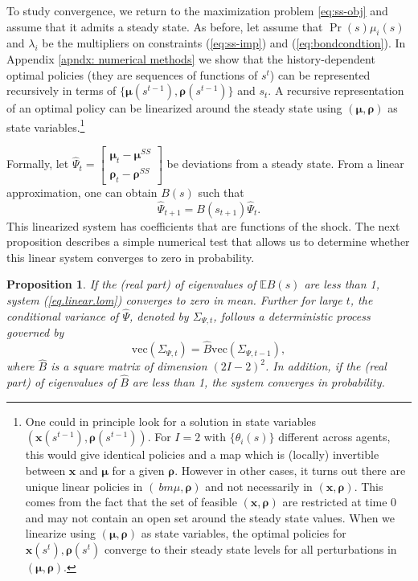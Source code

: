 \documentclass[thmsb,11pt]{article}
\newtheorem{proposition}{Proposition}
\newcommand{\bmat}{\begin{matrix}}
\newcommand{\emat}{\end{matrix}}
\begin{document}
To study convergence, we return to the maximization problem \eqref{eq:ss-obj} and assume that it admits a steady state. As before, let assume that $\Pr(s)\mu_i(s)$ and $\lambda_i$ be the multipliers on constraints (\ref{eq:ss-imp}) and (\ref{eq:bondcondtion}). In Appendix \ref{apndx: numerical methods} we show that the history-dependent optimal policies (they are sequences of functions of $s^t$) can be represented  recursively in terms of $\{\bm \mu(s^{t-1}),\bm \rho(s^{t-1})\}$ and $s_t$. A recursive representation of an optimal policy can be linearized around the steady state using $(\bm{\mu},\bm{\rho})$ as state variables.\footnote{One could  in principle look for a solution in state variables $\left(\bm{x}(s^{t-1}),\bm{\rho}(s^{t-1})\right)$. For $I=2$ with $\{\theta_i(s)\}$ different across agents, this would give identical policies and a map which is (locally) invertible between $\bm{x}$ and $\bm{\mu}$ for a given $\bm{\rho}$. However in other cases, it turns out there are unique linear policies in $(\
bm{\mu},\bm{\rho}
)$ and not necessarily in  $(\bm{x},\bm{\rho})$. This comes from the fact that the set of feasible $(\bm{x},\bm{\rho})$ are restricted at time 0 and may not contain an open set around the steady state values. When we linearize using $(\bm{\mu},\bm{\rho})$ as state variables, the optimal policies for $\bm{x}(s^t),\bm{\rho}(s^t)$ converge to their  steady state levels for all perturbations in $(\bm{\mu},\bm{\rho})$.}

Formally, let $\hat{\Psi}_{t}= \left[\bmat \bm{\mu}_{t} - \bm{\mu}^{SS}\\ \bm \rho_t - \bm \rho^{SS}\emat\right]$ be  deviations from a steady state. From a  linear approximation, one can obtain $B(s)$ such that
\begin{equation}
 \hat{\Psi}_{t+1}=B(s_{t+1})\hat{\Psi}_t. \label{eq.linear.lom}
\end{equation}
This linearized system has coefficients that are functions of the shock. The next proposition describes a simple numerical test that allows us to determine whether  this linear system converges to zero in probability.

\begin{proposition}\label{prop: localstability}
If the (real part) of eigenvalues of $\mathbb{E}B(s)$ are less than 1,  system (\ref{eq.linear.lom}) converges to zero  in mean. Further for large $t$, the conditional variance of $\hat{\Psi}$, denoted by $\Sigma_{\Psi,t}$, follows a deterministic process governed by
\[\text{vec}(\Sigma_{\Psi,t})=\hat{B} \text{vec}(\Sigma_{\Psi,t-1}),\]	
where $\hat{B}$ is a square matrix of dimension $(2I-2)^2$. In addition,  if the (real part) of eigenvalues of $\hat{B}$ are less than 1, the system converges in probability.
\end{proposition}
\end{document}
